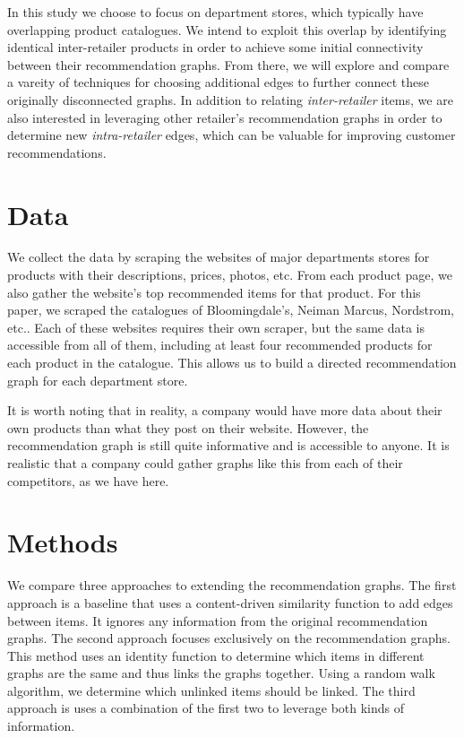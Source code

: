 \documentclass[10pt]{article}
\begin{document}
In this study we choose to focus on department stores, which typically have
overlapping product catalogues. We intend to exploit this overlap by identifying
identical inter-retailer products in order to achieve some initial connectivity
between their recommendation graphs. From there, we will explore and compare a
vareity of techniques for choosing additional edges to further connect these
originally disconnected graphs. In addition to relating {\em inter-retailer} items, we
are also interested in leveraging other retailer's recommendation graphs in
order to determine new {\em intra-retailer} edges, which can be valuable for
improving customer recommendations.

\section*{Data}
We collect the data by scraping the websites of major departments stores for
products with their descriptions, prices, photos, etc. From each product page,
we also gather the website's top recommended items for that product.  For this
paper, we scraped the catalogues of Bloomingdale's, Neiman Marcus, Nordstrom,
etc.. Each of these websites requires their own scraper, but the same data is
accessible from all of them, including at least four recommended products for
each product in the catalogue. This allows us to build a directed recommendation
graph for each department store. 

It is worth noting that in reality, a company would have more data about their
own products than what they post on their website. However, the recommendation
graph is still quite informative and is accessible to anyone.  It is realistic
that a company could gather graphs like this from each of their competitors, as
we have here.

\section*{Methods}
We compare three approaches to extending the recommendation graphs. The first
approach is a baseline that uses a content-driven similarity function to add
edges between items. It ignores any information from the original
recommendation graphs. The second approach focuses exclusively on the
recommendation graphs. This method uses an identity function to determine which
items in different graphs are the same and thus links the graphs together.
Using a random walk algorithm, we determine which unlinked items should be
linked. The third approach is uses a combination of the first two to leverage
both kinds of information.
\end{document}
